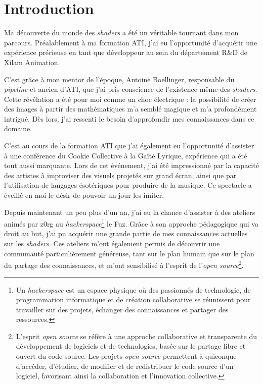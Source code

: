 \chapter{Introduction}

Ma découverte du monde des \textit{shaders} a été un véritable tournant dans mon parcours. Préalablement à ma formation ATI, j'ai eu l'opportunité d'acquérir une expérience précieuse en tant que développeur au sein du département R\&D de Xilam Animation.

C'est grâce à mon mentor de l'époque, Antoine Boellinger, responsable du \textit{pipeline} et ancien d'ATI, que j'ai pris conscience de l'existence même des \textit{shaders}. Cette révélation a été pour moi comme un choc électrique : la possibilité de créer des images à partir des mathématiques m'a semblé magique et m'a profondément intrigué. Dès lors, j'ai ressenti le besoin d'approfondir mes connaissances dans ce domaine.

C'est au cours de la formation ATI que j'ai également eu l'opportunité d'assister à une conférence du Cookie Collective à la Gaîté Lyrique, expérience qui a été tout aussi marquante. Lors de cet événement, j'ai été impressionné par la capacité des artistes à improviser des visuels projetés sur grand écran, ainsi que par l'utilisation de langages ésotériques pour produire de la musique. Ce spectacle a éveillé en moi le désir de pouvoir un jour les imiter.

Depuis maintenant un peu plus d'un an, j'ai eu la chance d'assister à des ateliers animés par z0rg au \textit{hackerspace}\footnote{Un \textit{hackerspace} est un espace physique où des passionnés de technologie, de programmation informatique et de création collaborative se réunissent pour travailler sur des projets, échanger des connaissances et partager des ressources.} le Fuz. Grâce à son approche pédagogique qui va droit au but, j'ai pu acquérir une grande partie de mes connaissances actuelles sur les \textit{shaders}. Ces ateliers m'ont également permis de découvrir une communauté particulièrement généreuse, tant sur le plan humain que sur le plan du partage des connaissances, et m'ont sensibilisé à l'esprit de l'\textit{open source}\footnote{L'esprit \textit{open source} se réfère à une approche collaborative et transparente du développement de logiciels et de technologies, basée sur le partage libre et ouvert du code source. Les projets \textit{open source} permettent à quiconque d'accéder, d'étudier, de modifier et de redistribuer le code source d'un logiciel, favorisant ainsi la collaboration et l'innovation collective.}.

